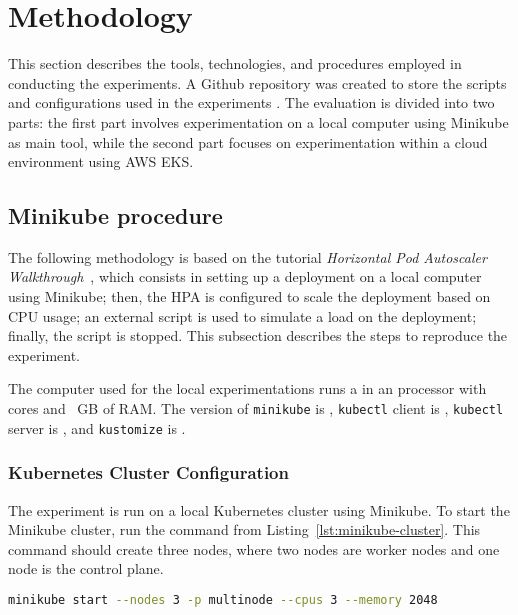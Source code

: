 \section{Methodology}

This section describes the tools, technologies, and procedures employed in conducting the experiments.
A Github repository was created to store the scripts and configurations used in the experiments \githubLink{}.
The evaluation is divided into two parts: the first part involves experimentation on a local computer using Minikube as main tool, while the second part focuses on experimentation within a cloud environment using AWS EKS.

\subsection{Minikube procedure}
The following methodology is based on the tutorial \textit{Horizontal Pod Autoscaler Walkthrough}~\cite{KubernetesHpaWalkthrough}, which consists in setting up a deployment on a local computer using Minikube; then, the HPA is configured to scale the deployment based on CPU usage; an external script is used to simulate a load on the deployment; finally, the script is stopped.
This subsection describes the steps to reproduce the experiment.

The computer used for the local experimentations runs a \operatingSystem{} in an \cpuModel{} processor with \cpuCores{} cores and \cpuRam{}~GB of RAM.
The version of \texttt{minikube} is \minikubeVersion{}, \texttt{kubectl} client is \kubectlClientVersion{}, \texttt{kubectl} server is \kubectlServerVersion{}, and \texttt{kustomize} is \kubectlKustomizeVersion{}.

\subsubsection{Kubernetes Cluster Configuration}
The experiment is run on a local Kubernetes cluster using Minikube.
To start the Minikube cluster, run the command from Listing~\ref{lst:minikube-cluster}.
This command should create three nodes, where two nodes are worker nodes and one node is the control plane.

\begin{lstlisting}[language=bash, label={lst:minikube-cluster},caption={Starting the Minikube cluster}]
  minikube start --nodes 3 -p multinode --cpus 3 --memory 2048
\end{lstlisting}

